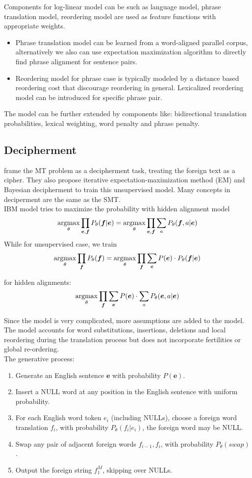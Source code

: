 Components for log-linear model can be such as language model, phrase translation model, reordering model are used as feature functions with appropriate weights.
\begin{itemize}
	\item Phrase translation model can be learned from a word-aligned parallel corpus, alternatively we also can use expectation maximization algorithm to directly find phrase alignment for sentence pairs.
	\item Reordering model for phrase case is typically modeled by a distance based reordering cost that discourage reordering in general. Lexicalized reordering model can be introduced for specific phrase pair.
\end{itemize}

The model can be further extended by components like: bidirectional translation probabilities, lexical weighting, word penalty and phrase penalty. 

\subsection{Decipherment}
\cite{ravi2011deciphering} frame the MT problem as a decipherment task, treating the foreign text as a cipher. They also propose iterative expectation-maximization method  (EM) and Bayesian decipherment to train this unsupervised model. Many concepts in deciperment are the same as the SMT.\\

IBM model tries to maximize the probability with hidden alignment model
\[ \underset{\theta}{\operatorname{argmax}} \prod_{\bm{e}, \bm{f}} {P_{\theta}(\bm{f}|\bm{e})} = \underset{\theta}{\operatorname{argmax}} \prod_{\bm{e}, \bm{f}} \sum_{a} P_{\theta}(\bm{f}, a| \bm{e})  \]
While for unsupervised case, we train 
\[ \underset{\theta}{\operatorname{argmax}} \prod_{\bm{f}}P_{\theta}(\bm{f})= \underset{\theta}{\operatorname{argmax}} \prod_{\bm{f}} \sum_{\bm{e}} P(\bm{e}) \cdot P_{\theta}(\bm{f}|\bm{e})\]

for hidden alignments: \[ \underset{\theta}{\operatorname{argmax}} \prod_{\bm{f}} \sum_{\bm{e}} P(\bm{e}) \cdot \sum_{a} P_{\theta}(\bm{e},a|\bm{e}) \]

Since the model is very complicated, more assumptions are added to the model. The model accounts for word substitutions, insertions, deletions and local reordering during the translation process but does not incorporate fertilities or global re-ordering.\\

The generative process:
\begin{enumerate}
	\item Generate an English sentence $\bm{e}$ with probability $P(\bm{e})$.
	\item Insert a NULL word at any position in the English sentence with uniform probability.
	\item For each English word token $e_i$ (including NULLs), choose a foreign word translation $f_i$, with probability $P_{\theta}(f_i| e_i)$, the foreign word may be NULL.
	\item Swap any pair of adjacent foreign words $f_{i-1}, f_i$, with probability ${P_{\theta}(swap)}$. 
	\item Output the foreign string $f_1^M$, skipping over NULLs.
\end{enumerate}

